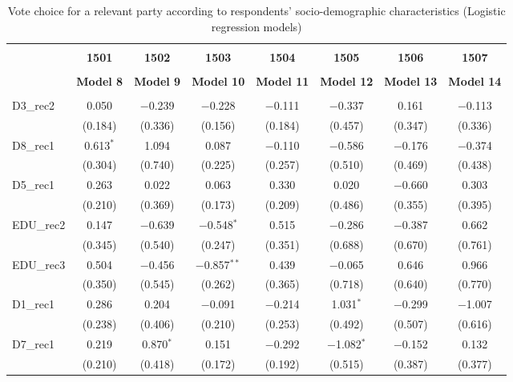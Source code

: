 \documentclass[
]{article}
\begin{document}
\begin{table}[!htbp] \centering 
  \caption{Vote choice for a relevant party according to respondents' 
                       socio-demographic characteristics (Logistic regression models)} 
  \label{table:full_logit_it} 
\begin{tabular}{@{\extracolsep{5pt}}lccccccc} 
\\[-1.8ex]\hline \\[-1.8ex] 
 & \textbf{1501} & \textbf{1502} & \textbf{1503} & \textbf{1504} & \textbf{1505} & \textbf{1506} & \textbf{1507} \\ 
\\[-1.8ex] & \textbf{Model 8} & \textbf{Model 9} & \textbf{Model 10} & \textbf{Model 11} & \textbf{Model 12} & \textbf{Model 13} & \textbf{Model 14}\\ 
\hline \\[-1.8ex] 
 D3\_rec2 & 0.050 & $-$0.239 & $-$0.228 & $-$0.111 & $-$0.337 & 0.161 & $-$0.113 \\ 
  & (0.184) & (0.336) & (0.156) & (0.184) & (0.457) & (0.347) & (0.336) \\ 
  D8\_rec1 & 0.613$^{*}$ & 1.094 & 0.087 & $-$0.110 & $-$0.586 & $-$0.176 & $-$0.374 \\ 
  & (0.304) & (0.740) & (0.225) & (0.257) & (0.510) & (0.469) & (0.438) \\ 
  D5\_rec1 & 0.263 & 0.022 & 0.063 & 0.330 & 0.020 & $-$0.660 & 0.303 \\ 
  & (0.210) & (0.369) & (0.173) & (0.209) & (0.486) & (0.355) & (0.395) \\ 
  EDU\_rec2 & 0.147 & $-$0.639 & $-$0.548$^{*}$ & 0.515 & $-$0.286 & $-$0.387 & 0.662 \\ 
  & (0.345) & (0.540) & (0.247) & (0.351) & (0.688) & (0.670) & (0.761) \\ 
  EDU\_rec3 & 0.504 & $-$0.456 & $-$0.857$^{**}$ & 0.439 & $-$0.065 & 0.646 & 0.966 \\ 
  & (0.350) & (0.545) & (0.262) & (0.365) & (0.718) & (0.640) & (0.770) \\ 
  D1\_rec1 & 0.286 & 0.204 & $-$0.091 & $-$0.214 & 1.031$^{*}$ & $-$0.299 & $-$1.007 \\ 
  & (0.238) & (0.406) & (0.210) & (0.253) & (0.492) & (0.507) & (0.616) \\ 
  D7\_rec1 & 0.219 & 0.870$^{*}$ & 0.151 & $-$0.292 & $-$1.082$^{*}$ & $-$0.152 & 0.132 \\ 
  & (0.210) & (0.418) & (0.172) & (0.192) & (0.515) & (0.387) & (0.377) \\ 

\end{tabular}
\end{table}
\end{document}
